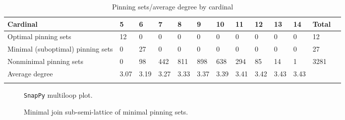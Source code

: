 \documentclass{article}%
\begin{document}
\begin{table}[ht]
	\caption{Pinning sets/average degree by cardinal}
	\centering
	\renewcommand{\arraystretch}{1.5}
	\begin{tabularx}{\textwidth}{lXXXXXXXXXXXX}
		\toprule
			Cardinal & 5 & 6 & 7 & 8 & 9 & 10 & 11 & 12 & 13 & 14 & Total\\
			\hline
			Optimal pinning sets & 12 & 0 & 0 & 0 & 0 & 0 & 0 & 0 & 0 & 0 & 12 \\
			Minimal (suboptimal) pinning sets & 0 & 27 & 0 & 0 & 0 & 0 & 0 & 0 & 0 & 0 & 27 \\
			Nonminimal pinning sets & 0 & 98 & 442 & 811 & 898 & 638 & 294 & 85 & 14 & 1 & 3281 \\
			Average degree & 3.07 & 3.19 & 3.27 & 3.33 & 3.37 & 3.39 & 3.41 & 3.42 & 3.43 & 3.43 &  \\
		\bottomrule \\ 
	\end{tabularx}
\end{table}

\begin{multicols}{2}
\begin{figure}[H]
\centering

\caption{\texttt{SnapPy} multiloop plot.}
\label{fig:tex/img/[[7, 24, 8, 1], [11, 6, 12, 7], [23, 18, 24, 19], [8, 18, 9, 17], [1, 17, 2, 16], [10, 15, 11, 16], [5, 20, 6, 21], [12, 20, 13, 19], [22, 3, 23, 4], [9, 3, 10, 2], [14, 21, 15, 22], [4, 13, 5, 14]].svg}
\end{figure}
\columnbreak

\begin{figure}[H]
\centering
\scalebox{0.8}{}
\caption{Minimal join sub-semi-lattice of minimal pinning sets.}
\label{fig:tex/img/[[7, 24, 8, 1], [11, 6, 12, 7], [23, 18, 24, 19], [8, 18, 9, 17], [1, 17, 2, 16], [10, 15, 11, 16], [5, 20, 6, 21], [12, 20, 13, 19], [22, 3, 23, 4], [9, 3, 10, 2], [14, 21, 15, 22], [4, 13, 5, 14]].pgf}
\end{figure}
\end{multicols}

\newpage
\end{document}
